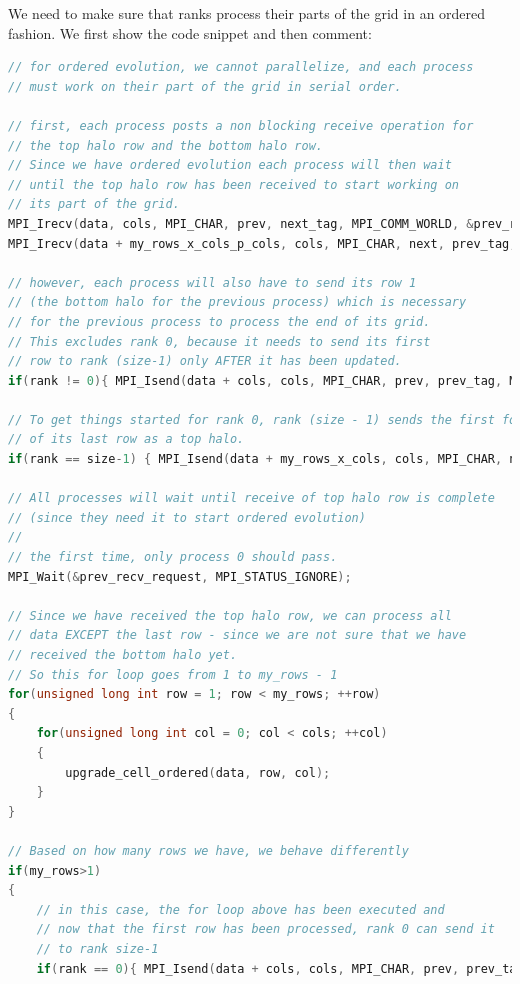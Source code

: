 \documentclass{report}
\begin{document}
We need to make sure that ranks process their parts of the grid in an ordered 
fashion. We first show the code snippet and then comment:
\pagebreak
\begin{lstlisting}[language=C++]
// for ordered evolution, we cannot parallelize, and each process 
// must work on their part of the grid in serial order. 

// first, each process posts a non blocking receive operation for 
// the top halo row and the bottom halo row. 
// Since we have ordered evolution each process will then wait 
// until the top halo row has been received to start working on 
// its part of the grid.
MPI_Irecv(data, cols, MPI_CHAR, prev, next_tag, MPI_COMM_WORLD, &prev_recv_request);
MPI_Irecv(data + my_rows_x_cols_p_cols, cols, MPI_CHAR, next, prev_tag, MPI_COMM_WORLD, &next_recv_request);

// however, each process will also have to send its row 1
// (the bottom halo for the previous process) which is necessary 
// for the previous process to process the end of its grid.
// This excludes rank 0, because it needs to send its first
// row to rank (size-1) only AFTER it has been updated. 
if(rank != 0){ MPI_Isend(data + cols, cols, MPI_CHAR, prev, prev_tag, MPI_COMM_WORLD, &prev_send_request);}

// To get things started for rank 0, rank (size - 1) sends the first forward message 
// of its last row as a top halo.
if(rank == size-1) { MPI_Isend(data + my_rows_x_cols, cols, MPI_CHAR, next, next_tag, MPI_COMM_WORLD, &next_send_request); }

// All processes will wait until receive of top halo row is complete 
// (since they need it to start ordered evolution)
//
// the first time, only process 0 should pass.
MPI_Wait(&prev_recv_request, MPI_STATUS_IGNORE);

// Since we have received the top halo row, we can process all 
// data EXCEPT the last row - since we are not sure that we have 
// received the bottom halo yet.
// So this for loop goes from 1 to my_rows - 1
for(unsigned long int row = 1; row < my_rows; ++row)
{
    for(unsigned long int col = 0; col < cols; ++col)
    {
        upgrade_cell_ordered(data, row, col);
    }
}

// Based on how many rows we have, we behave differently
if(my_rows>1)
{
    // in this case, the for loop above has been executed and 
    // now that the first row has been processed, rank 0 can send it 
    // to rank size-1
    if(rank == 0){ MPI_Isend(data + cols, cols, MPI_CHAR, prev, prev_tag, MPI_COMM_WORLD, &prev_send_request);}


\end{lstlisting}
\end{document}
